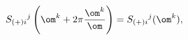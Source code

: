 \begin{equation*}
  S_{(+)i}{}^j\left(\om^k+2\pi\frac{\om^k}\om\right)=S_{(+)i}{}^j(\om^k),
\end{equation*}


